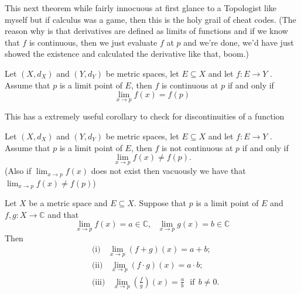 	 
	 This next theorem while fairly innocuous at first glance to a Topologist like myself but if calculus was a game, then this is the holy grail of cheat codes. (The reason why is that derivatives are defined as limits of functions and if we know that $f$ is continuous, then we just evaluate $f$ at $p$ and we're done, we'd have just showed the existence and calculated the derivative like that, boom.)
	 
	 \begin{theorem}
	 	Let $(X, d_X)$ and $(Y, d_Y)$ be metric spaces, let $E \subseteq X$ and let $f : E \to Y$ . Assume that $p$ is a limit point of $E$, then $f$ is continuous at $p$ if and only if $$\lim_{x \to p} f(x) = f(p)$$
	 \end{theorem}
	 
	 This has a extremely useful corollary to check for discontinuities of a function
	 
	 \begin{corollary}
	 	Let $(X, d_X)$ and $(Y, d_Y)$ be metric spaces, let $E \subseteq X$ and let $f : E \to Y$ . Assume that $p$ is a limit point of $E$, then $f$ is not continuous at $p$ if and only if $$\lim_{x \to p} f(x) \neq f(p).$$ (Also if $ \lim_{x \to p} f(x)$ does not exist then vacuously we have that $\lim_{x \to p} f(x) \neq f(p)$)
	 \end{corollary}
	 
	 \begin{theorem}
	 	Let $X$ be a metric space and $E \subseteq X$. Suppose that $p$ is a limit point of $E$ and $f, g : X \to \mathbb{C}$ and that $$\lim_{x \to p} f(x) = a \in \mathbb{C}, \ \ \ \lim_{x \to p} g(x) = b \in \mathbb{C}$$Then  	
	 	\begin{align*}
	 	&\text{(i)} \ \  \ \ \lim_{x \to p}(f+g)(x) = a + b; \\
	 	&\text{(ii)} \ \  \ \ \lim_{x \to p}(f\cdot g)(x) = a \cdot b; \\
	 	&\text{(iii)} \ \  \ \ \lim_{x \to p}\left( \frac{f}{g}\right) (x) = \frac{a}{b} \ \ \ \text{if} \ \ b\neq 0.
	 	\end{align*}
	 	
	 \end{theorem}
	 
